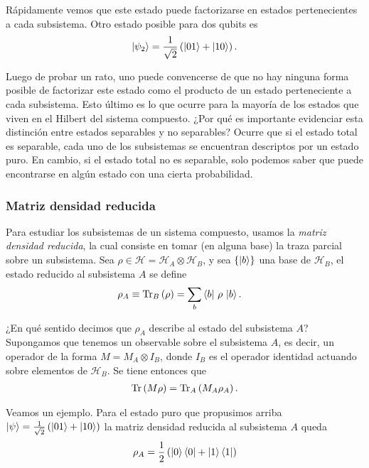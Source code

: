 \documentclass[../main.tex]{subfiles}
\begin{document}
Rápidamente vemos que este estado puede factorizarse en estados pertenecientes a cada subsistema. Otro estado posible para dos qubits es
\begin{align}
	\left | \psi_2 \right \rangle = \frac 1{\sqrt 2} \left ( \left | 0 1 \right \rangle + \left | 1 0 \right \rangle \right ).
	\label{eq:ch2_bell_pair}
\end{align}

Luego de probar un rato, uno puede convencerse de que no hay ninguna forma posible de factorizar este estado como el producto de un estado perteneciente a cada subsistema. Esto último es lo que ocurre para la mayoría de los estados que viven en el Hilbert del sistema compuesto. ¿Por qué es importante evidenciar esta distinción entre estados separables y no separables? Ocurre que si el estado total es separable, cada uno de los subsistemas se encuentran descriptos por un estado puro. En cambio, si el estado total no es separable, solo podemos saber que puede encontrarse en algún estado con una cierta probabilidad.

\subsubsection{Matriz densidad reducida}

Para estudiar los subsistemas de un sistema compuesto, usamos la \textit{matriz densidad reducida}, la cual consiste en tomar (en alguna base) la traza parcial sobre un subsistema. Sea $\rho \in \mathcal H = \mathcal H_A \otimes \mathcal H_B$, y sea $\left \{ \left | b \right \rangle \right \}$ una base de $\mathcal H_B$, el estado reducido al subsistema $A$ se define
\begin{align}
	& \rho_A \equiv \text{Tr}_B\left ( \rho \right ) = \sum_b \left \langle b \right |\, \rho\, \left | b \right \rangle.
\end{align}

¿En qué sentido decimos que $\rho_A$ describe al estado del subsistema $A$? Supongamos que tenemos un observable sobre el subsistema $A$, es decir, un operador de la forma $M = M_A \otimes I_B$, donde $I_B$ es el operador identidad actuando sobre elementos de $\mathcal H_B$. Se tiene entonces que
\begin{align}
	\text{Tr}\left ( M \rho \right ) = \text{Tr}_A\left ( M_A \rho_A \right ).
\end{align}

Veamos un ejemplo. Para el estado puro que propusimos arriba $\left | \psi \right \rangle = \frac 1{\sqrt 2} \left ( \left | 0 1 \right \rangle + \left | 1 0 \right \rangle \right )$ la matriz densidad reducida al subsistema $A$ queda
\begin{align}
	\rho_A = \frac 12\left ( \left | 0 \right \rangle \left \langle 0 \right | + \left | 1 \right \rangle \left \langle 1 \right | \right )
\end{align}
\end{document}
